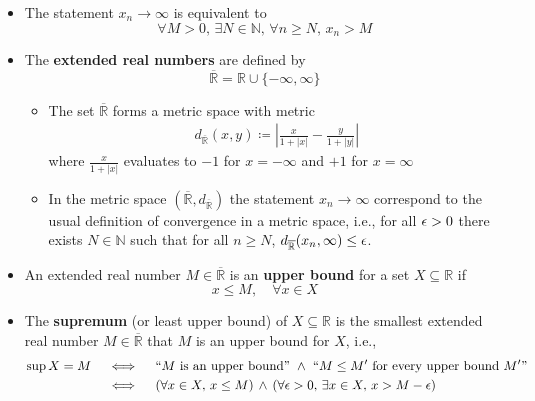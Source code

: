 \documentclass[11pt,twoside]{report}
\newcommand{\bbN}{{\mathbb{N}}}
\newcommand{\bbR}{{\mathbb{R}}}
\begin{document}
\begin{itemize}

\item The statement $x_n \to \infty$ is equivalent to  
\[
\forall M > 0, \, \exists N \in \bbN, \, \forall n \ge N, \, x_n  >  M 
\]

\item The \textbf{extended real numbers} are defined by
\[
\overline{\bbR} = \bbR \cup \{ -  \infty,  \infty\}
\]
\begin{itemize}
\item The set $\overline{\bbR}$ forms a metric  space with metric
\begin{align*}
d_{\overline{\bbR}}(x,y) \coloneqq \left | \frac{ x }{ 1 + |x|}  - \frac{ y}{ 1 + |y|} \right|
\end{align*}
where $\frac{x}{1+ |x|}$ evaluates to $-1$ for $x =  - \infty$ and $+1 $ for $x  =  \infty$


\item In the metric space $(\overline{\bbR}, d_{\overline{\bbR}})$ the statement $x_n \to \infty$ correspond to the usual definition of convergence in a metric space, i.e., for all $\epsilon > 0$ there exists $N \in \bbN$ such that for all $n \ge 
N$,  $d_{\overline{\bbR}}(x_n, \infty) \le \eps$. 

\end{itemize}


\item %
An extended real number $M \in \overline{\bbR}$  is an \textbf{upper bound} for a set $X \subseteq \bbR$ if 
\[
x \le M, \quad \forall x \in X
\]



\item The \textbf{supremum} (or least upper bound) of $X\subseteq \bbR$ is the 
 smallest extended real number $M \in \overline{\bbR}$ that $M$ is an upper bound for $X$, i.e., 
 \begin{align*}
 \sup X =  M \quad &  \iff 
 \quad \text{``$M$ is an upper bound'' }  \wedge  \text{ ``$M \le M'$ for every  upper bound $M'$''}\\
 & \iff  \quad    (\forall x \in X, \, x \le M) \,   \wedge \,  (\forall \epsilon > 0, \,  \exists x \in X,  \,  x > M - \epsilon)  
 \end{align*}
 

\end{itemize}
\end{document}
